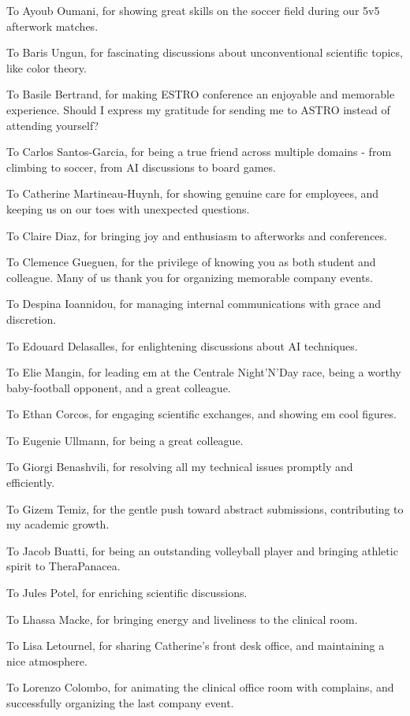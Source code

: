 To Ayoub Oumani, for showing great skills on the soccer field during our 5v5 afterwork matches.

To Baris Ungun, for fascinating discussions about unconventional scientific topics, like color theory.

To Basile Bertrand, for making ESTRO conference an enjoyable and memorable experience.
Should I express my gratitude for sending me to ASTRO instead of attending yourself?

To Carlos Santos-Garcia, for being a true friend across multiple domains - from climbing to soccer, from AI discussions to board games.

To Catherine Martineau-Huynh, for showing genuine care for employees, and keeping us on our toes with unexpected questions.

To Claire Diaz, for bringing joy and enthusiasm to afterworks and conferences.

To Clemence Gueguen, for the privilege of knowing you as both student and colleague.
Many of us thank you for organizing memorable company events.

To Despina Ioannidou, for managing internal  communications with grace and discretion.

To Edouard Delasalles, for enlightening discussions about AI techniques.

To Elie Mangin, for leading em at the Centrale Night'N'Day race, being a worthy baby-football opponent, and a great colleague.

To Ethan Corcos, for engaging scientific exchanges, and showing em cool figures.

To Eugenie Ullmann, for being a great colleague.

To Giorgi Benashvili, for resolving all my technical issues promptly and efficiently.

To Gizem Temiz, for the gentle push toward abstract submissions, contributing to my academic growth.

To Jacob Buatti, for being an outstanding volleyball player and bringing athletic spirit to TheraPanacea.

To Jules Potel, for enriching scientific discussions.

To Lhassa Macke, for bringing energy and liveliness to the clinical room.

To Lisa Letournel, for sharing Catherine's front desk office, and maintaining a nice atmosphere.

To Lorenzo Colombo, for animating the clinical office room with complains, and successfully organizing the last company event.

